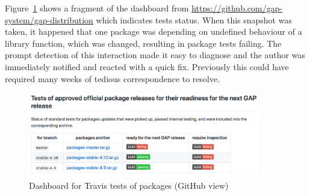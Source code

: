 Figure~\ref{fig:gap-docker-pkg-tests} shows a fragment of the
dashboard from \url{https://github.com/gap-system/gap-distribution}
which indicates tests status. When this snapshot was taken, it
happened that one package was depending on undefined behaviour of a
\GAP library function, which was changed, resulting in package tests
failing. The prompt detection of this interaction made it easy to
diagnose and the author was immediately notified and reacted with a
quick fix. Previously this could have required many weeks of tedious
correspondence to resolve.



\begin{figure}[!ht]
  \centering
  \begin{mdframed}
    \includegraphics[width=0.9\textwidth]{images/gap-docker-pkg-tests}
    \end{mdframed}
    \caption{Dashboard for Travis tests of \GAP packages (GitHub view)}
    \label{fig:gap-docker-pkg-tests}
\end{figure}




